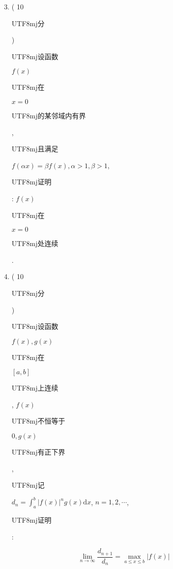 \documentclass[10pt]{article}
\begin{document}
\begin{enumerate}
  \setcounter{enumi}{2}
  \item ( 10 \begin{CJK}{UTF8}{mj}分\end{CJK}) \begin{CJK}{UTF8}{mj}设函数\end{CJK} $f(x)$ \begin{CJK}{UTF8}{mj}在\end{CJK} $x=0$ \begin{CJK}{UTF8}{mj}的某邻域内有界\end{CJK}, \begin{CJK}{UTF8}{mj}且满足\end{CJK} $f(\alpha x)=\beta f(x), \alpha>1, \beta>1$, \begin{CJK}{UTF8}{mj}证明\end{CJK}: $f(x)$ \begin{CJK}{UTF8}{mj}在\end{CJK} $x=0$ \begin{CJK}{UTF8}{mj}处连续\end{CJK}.

  \item ( 10 \begin{CJK}{UTF8}{mj}分\end{CJK}) \begin{CJK}{UTF8}{mj}设函数\end{CJK} $f(x), g(x)$ \begin{CJK}{UTF8}{mj}在\end{CJK} $[a, b]$ \begin{CJK}{UTF8}{mj}上连续\end{CJK}, $f(x)$ \begin{CJK}{UTF8}{mj}不恒等于\end{CJK} $0, g(x)$ \begin{CJK}{UTF8}{mj}有正下界\end{CJK}, \begin{CJK}{UTF8}{mj}记\end{CJK} $d_{n}=\int_{a}^{b}|f(x)|^{n} g(x) \mathrm{d} x$, $n=1,2, \cdots$, \begin{CJK}{UTF8}{mj}证明\end{CJK}:

\end{enumerate}
$$
\lim _{n \rightarrow \infty} \frac{d_{n+1}}{d_{n}}=\max _{a \leqslant x \leqslant b}|f(x)|
$$
\end{document}
